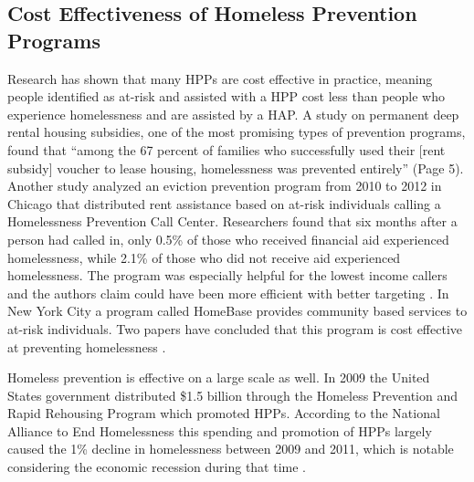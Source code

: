 \documentclass[12pt]{report}
\begin{document}
\subsection{Cost Effectiveness of Homeless Prevention Programs}
Research has shown that many HPPs are cost effective in practice, meaning people identified as at-risk and assisted with a HPP cost less than people who experience homelessness and are assisted by a HAP. A study on permanent deep rental housing subsidies, one of the most promising types of prevention programs, found that ``among the 67 percent of families who successfully used their [rent subsidy] voucher to lease housing, homelessness was prevented entirely'' \cite{shinn2019homelessness} (Page 5). Another study analyzed an eviction prevention program from 2010 to 2012 in Chicago that distributed rent assistance based on at-risk individuals calling a Homelessness Prevention Call Center. Researchers found that six months after a person had called in, only 0.5\% of those who received financial aid experienced homelessness, while 2.1\% of those who did not receive aid experienced homelessness. The program was especially helpful for the lowest income callers and the authors claim could have been more efficient with better targeting \cite{evans2016impact}. In New York City a program called HomeBase provides community based services to at-risk individuals. Two papers have concluded that this program is cost effective at preventing homelessness \cite{rolston2013evaluation} \cite{goodman2016homelessness}. 

Homeless prevention is effective on a large scale as well. In 2009 the United States government distributed \$1.5 billion through the Homeless Prevention and Rapid Rehousing Program which promoted HPPs. According to the National Alliance to End Homelessness this spending and promotion of HPPs largely caused the 1\% decline in homelessness between 2009 and 2011, which is notable considering the economic recession during that time \cite{shinn2013efficient}.
\end{document}
